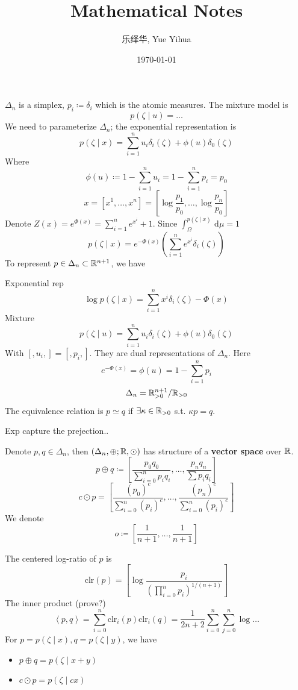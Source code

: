 \documentclass{amsart}
\author{乐绎华, Yue Yihua}
\date{\today}
\title{Mathematical Notes}
\let\originalmathbb\mathbb
\renewcommand{\mathbb}[1]{%
    \ifstrequal{#1}{1}{\mathbbm{#1}}{\originalmathbb{#1}}%
}
\theoremstyle{plain}
\theoremstyle{definition}
\theoremstyle{remark}
\begin{document}
\maketitle

$\Delta _n$ is a simplex, $p_i\coloneqq\delta_{i}$ which is the atomic measures. The mixture model is
\[
p(\zeta \mid u)=\dots
\]
We need to parameterize $\Delta _n$; the exponential representation is
\[
p(\zeta \mid x)=\sum_{i=1}^{n} u_i\delta _i(\zeta)+\phi(u)\delta_0(\zeta)
\]
Where
\[
\phi(u)\coloneqq 1-\sum_{i=1}^{n} u_i=1-\sum_{i=1}^{n} p_i=p_0
\]
\[
x=\left[ x^{1},\dots,x^{n} \right]=\left[ \log \frac{p_1}{p_0},\dots,\log\frac{p_n}{p_0} \right]
\]
Denote $Z(x)=e^{ \Phi(x) }=\sum_{i=1}^{n}e^{ x^{i} }+1$. Since $\int_{\Omega}^{p(\zeta \mid x)} \, \mathrm{d}\mu=1$
\[
p(\zeta \mid  x)=e^{ -\Phi (x) }\left( \sum_{i=1}^{n} e^{ x^{i} }\delta _i(\zeta) \right)
\]
To represent $p\in\Delta _n\subset \mathbb{R}^{n+1}$, we have

Exponential rep
\[
\log p(\zeta \mid x)=\sum_{i=1}^{n} x^{i}\delta _i(\zeta)-\Phi(x)
\]
Mixture
\[
p(\zeta \mid u)=\sum_{i=1}^{n} u_i\delta _i(\zeta)+\phi (u)\delta_0(\zeta)
\]
With $[,u_i,]=[,p_i,]$. They are dual representations of $\Delta _n$. Here
\[
e^{ -\Phi(x) }=\phi(u)=1-\sum_{i=1}^{n}  p_i
\]
\[
\Delta _n=\mathbb{R}^{n+1}_{>0}/\mathbb{R}_{>0}
\]
The equivalence relation is $p \simeq q$ if $\exists \kappa\in \mathbb{R}_{>0}$ s.t. $\kappa p=q$.

Exp capture the prejection..

Denote $p, q\in\Delta _{n}$, then $(\Delta _n,\oplus;\mathbb{R},\odot)$ has structure of a \textbf{vector space} over $\mathbb{R}$.
\[
p\oplus q\coloneqq \left[ \frac{p_0q_0}{\sum_{i=0}^{n} p_iq_i},\dots,\frac{p_nq_n}{\sum p_iq_i} \right]
\]
\[
c\odot p=\left[ \frac{(p_0)^{c}}{\sum_{i=0}^{n} (p_i)^{c}},\dots,\frac{(p_n)^{c}}{\sum_{i=0}^{n} (p_i)^{c}} \right]
\]
We denote
\[
o\coloneqq \left[ \frac{1}{n+1},\dots,\frac{1}{n+1} \right]
\]

The centered log-ratio of $p$ is
\[
\text{clr}(p)=\left[ \log\frac{p_i}{\left( \prod_{i=0}^{n} p_i \right)^{1/(n+1)}} \right]
\]
The inner product (prove?)
\[
\left< p,q \right> =\sum_{i=0}^{n}\text{clr}_i(p)\text{clr}_i(q)=\frac{1}{2n+2}\sum_{i=0}^{n} \sum_{j=0}^{n} \log\dots
\]
For $p=p (\zeta \mid x), q=p (\zeta \mid y)$, we have

\begin{itemize}
	\item $p\oplus q=p(\zeta \mid x+y)$
	\item $c\odot p=p(\zeta \mid cx)$
\end{itemize}
\end{document}
